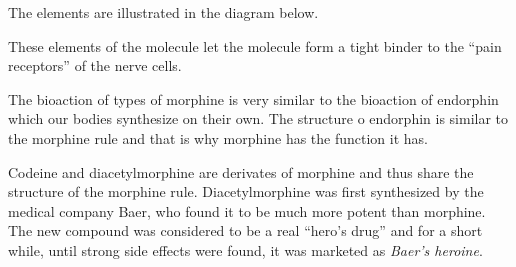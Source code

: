 \documentclass[../mit-general-chemistry.tex]{subfiles}
\begin{document}
The elements are illustrated in the diagram below.

\begin{center}
\end{center}

These elements of the molecule let the molecule form a tight binder to
the ``pain receptors'' of the nerve cells.

The bioaction of types of morphine is very similar to the bioaction of
endorphin which our bodies synthesize on their own. The structure o
endorphin is similar to the morphine rule and that is why morphine
has the function it has.

Codeine and diacetylmorphine are derivates of morphine and thus share
the structure of the morphine rule. Diacetylmorphine was first
synthesized by the medical company Baer, who found it to be much more
potent than morphine. The new compound was considered to be a real
``hero's drug'' and for a short while, until strong side effects were
found, it was marketed as {\em Baer's heroine}.




\end{document}
